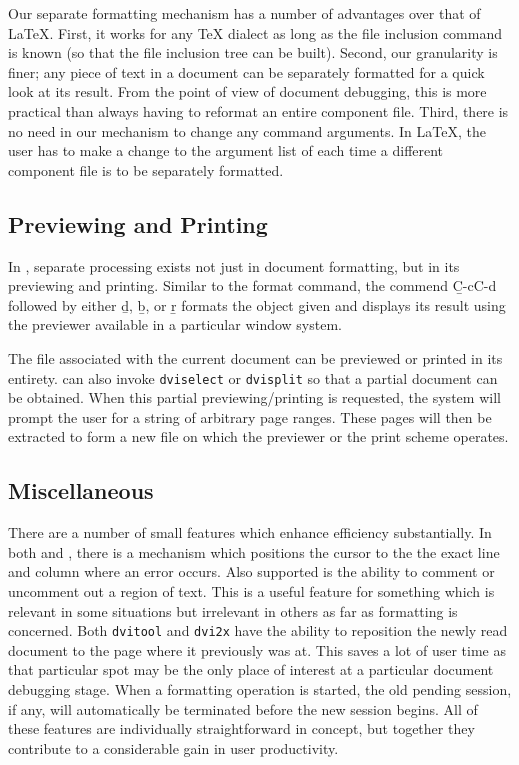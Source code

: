 Our separate formatting mechanism has a number of advantages over that
of {\LaTeX}.  First, it works for any {\TeX} dialect as long as
the file inclusion command is known (so that the file inclusion tree
can be built).  Second, our granularity is finer; any piece of text
in a document can be separately formatted for a quick look at its result.
From the point of view of document debugging, this is more practical
than always having to reformat an entire component file.
Third, there is no need in our mechanism to change any command arguments.
In {\LaTeX}, the user has to make a change to the argument list
of \verb|| each time a different component file is to be
separately formatted.

\subsection{Previewing and Printing}
In {\TM}, separate processing exists not just in document formatting,
but in its previewing and printing.  Similar to the format command,
the commend {\b C-c{\s}C-d} followed by either {\b d}, {\b b}, or {\b r}
formats the object given and displays its result using the {\dvi} previewer
available in a particular window system.

The {\dvi} file associated with the current document can be previewed or
printed in its entirety.
{\TM} can also invoke \verb|dviselect| or \verb|dvisplit| so that a partial
document can be obtained.  When this partial previewing/printing
is requested, the system will prompt the user for a string of arbitrary
page ranges.  These pages will then be extracted to form a new {\dvi} file
on which the previewer or the print scheme operates.

\subsection{Miscellaneous}
There are a number of small features which enhance efficiency substantially.
In both {\TM} and {\BM}, there is a mechanism which positions
the cursor to the the exact line and column where an error occurs.  
Also supported is the ability to comment or uncomment out a region of text.
This is a useful feature for something which is relevant in some situations
but irrelevant in others as far as formatting is concerned.
Both \verb|dvitool| and \verb|dvi2x| have the ability to reposition
the newly read document to the page where it previously was at.
This saves a lot of user time as that particular spot may be the only
place of interest at a particular document debugging stage.
When a formatting operation is started, the old pending session, if any,
will automatically be terminated before the new session begins.
All of these features are individually straightforward in concept,
but together they contribute to a considerable gain in user productivity.

